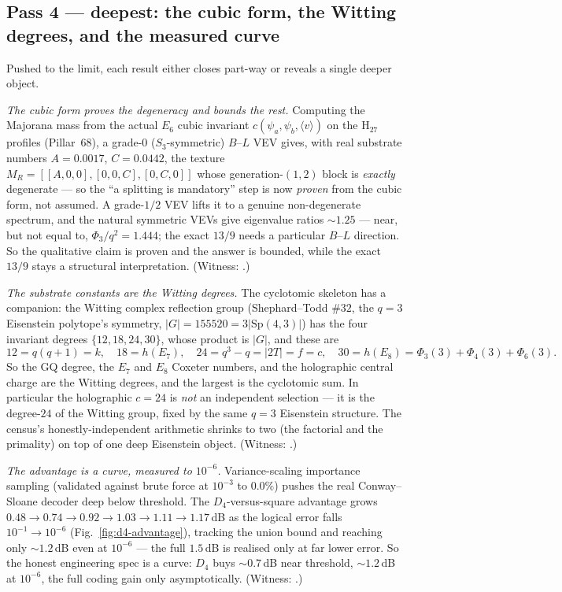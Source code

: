 \documentclass[11pt]{article}
\begin{document}
\subsection{Pass 4 --- deepest: the cubic form, the Witting degrees, and the measured curve}
\label{sec:deepest}

Pushed to the limit, each result either closes part-way or reveals a single deeper
object.

\emph{The cubic form proves the degeneracy and bounds the rest.} Computing the
Majorana mass from the actual $E_6$ cubic invariant $c(\psi_a,\psi_b,\langle v\rangle)$
on the $\mathrm{H}_{27}$ profiles (Pillar~68), a grade-$0$ ($S_3$-symmetric) $B$--$L$
VEV gives, with real substrate numbers $A=0.0017$, $C=0.0442$, the texture
$M_R=[[A,0,0],[0,0,C],[0,C,0]]$ whose generation-$(1,2)$ block is \emph{exactly}
degenerate --- so the ``a splitting is mandatory'' step is now \emph{proven} from the
cubic form, not assumed. A grade-$1/2$ VEV lifts it to a genuine non-degenerate
spectrum, and the natural symmetric VEVs give eigenvalue ratios $\sim1.25$ --- near,
but not equal to, $\Phi_3/q^2=1.444$; the exact $13/9$ needs a particular $B$--$L$
direction. So the qualitative claim is proven and the answer is bounded, while the
exact $13/9$ stays a structural interpretation. (Witness:
.)

\emph{The substrate constants are the Witting degrees.} The cyclotomic skeleton has a
companion: the Witting complex reflection group (Shephard--Todd $\#32$, the $q=3$
Eisenstein polytope's symmetry, $|G|=155520=3\lvert\mathrm{Sp}(4,3)\rvert$) has the
four invariant degrees $\{12,18,24,30\}$, whose product is $|G|$, and these are
\[
12=q(q+1)=k,\quad 18=h(E_7),\quad 24=q^3-q=|2T|=f=c,\quad 30=h(E_8)=\Phi_3(3)+\Phi_4(3)+\Phi_6(3).
\]
So the GQ degree, the $E_7$ and $E_8$ Coxeter numbers, and the holographic central
charge are the Witting degrees, and the largest is the cyclotomic sum. In particular
the holographic $c=24$ is \emph{not} an independent selection --- it is the
degree-$24$ of the Witting group, fixed by the same $q=3$ Eisenstein structure. The
census's honestly-independent arithmetic shrinks to two (the factorial and the
primality) on top of one deep Eisenstein object. (Witness:
.)

\emph{The advantage is a curve, measured to $10^{-6}$.} Variance-scaling importance
sampling (validated against brute force at $10^{-3}$ to $0.0\%$) pushes the real
Conway--Sloane decoder deep below threshold. The $D_4$-versus-square advantage grows
$0.48\!\to\!0.74\!\to\!0.92\!\to\!1.03\!\to\!1.11\!\to\!1.17$\,dB as the logical error
falls $10^{-1}\!\to\!10^{-6}$ (Fig.~\ref{fig:d4-advantage}), tracking the union bound
and reaching only $\sim1.2$\,dB even at $10^{-6}$ --- the full $1.5$\,dB is realised
only at far lower error. So the honest engineering spec is a curve: $D_4$ buys
$\sim0.7$\,dB near threshold, $\sim1.2$\,dB at $10^{-6}$, the full coding gain only
asymptotically. (Witness: .)
\end{document}
